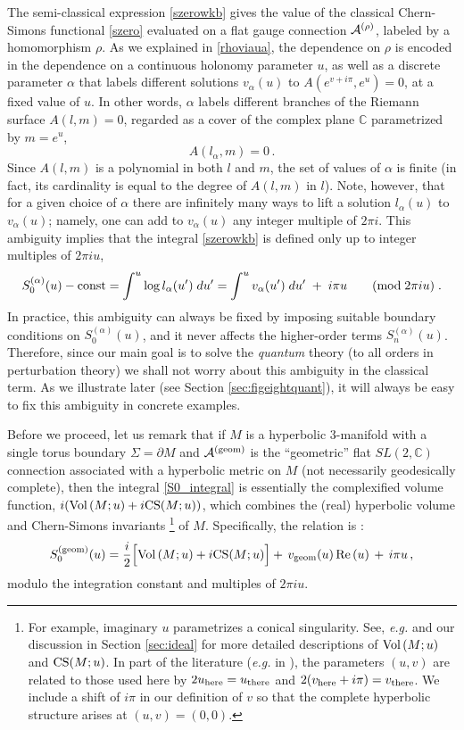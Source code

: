 \documentclass[hyper]{JHEP3}
\renewcommand{\Re}{{\rm Re}\,}
\def\CA {{\cal A}}
\newcommand{\C}{{\mathbb{C}}}
\newcommand\be{\begin{equation}}
\newcommand\ee{\end{equation}}
\newcommand{\Vol}{{\mbox{Vol\,}}}
\begin{document}
The semi-classical expression \eqref{szerowkb} gives the value of the classical
Chern-Simons functional \eqref{szero} evaluated on a flat gauge connection $\CA^{(\rho)}$,
labeled by a homomorphism $\rho$.
As we explained in \eqref{rhoviaua}, the dependence on $\rho$ is encoded in
the dependence on a continuous holonomy parameter $u$, as well as a discrete parameter $\alpha$
that labels different solutions $v_{\alpha} (u)$ to $A (e^{v + i\pi} , e^u) = 0$,
at a fixed value of $u$.
In other words, $\alpha$ labels different branches of the Riemann surface $A(l,m) = 0$,
regarded as a cover of the complex plane $\C$ parametrized by $m = e^u$,
\be
A (l_{\alpha} , m) = 0\,.
\label{abranches}
\ee
Since $A(l,m)$ is a polynomial in both $l$ and $m$, the set of values of $\alpha$
is finite (in fact, its cardinality is equal to the degree of $A(l,m)$ in $l$).
Note, however, that for a given choice of $\alpha$ there are infinitely many ways to
lift a solution $l_{\alpha} (u)$ to $v_{\alpha} (u)$; namely, one can add to $v_{\alpha} (u)$
any integer multiple of $2\pi i$.
This ambiguity implies that the integral \eqref{szerowkb} is defined only
up to integer multiples of $2 \pi i u$,
\be
S_0^{(\alpha)}(u) - {\rm const}
=  \int^u\log l_\alpha(u')\;du' = \int^u v_\alpha(u')\;du'
\;+\; i \pi u \qquad (\mbox{mod}\;2\pi i u)\;.
\label{S0_integral}
\ee
In practice, this ambiguity can always be fixed by imposing
suitable boundary conditions on $S_0^{(\alpha)}(u)$, and it never affects
the higher-order terms $S_n^{(\alpha)}(u)$.
Therefore, since our main goal is to solve the {\it quantum} theory
(to all orders in perturbation theory) we shall not worry about this
ambiguity in the classical term.
As we illustrate later (see Section \ref{sec:figeightquant}),
it will always be easy to fix this ambiguity in concrete examples.

Before we proceed, let us remark that if $M$ is a hyperbolic 3-manifold
with a single torus boundary $\Sigma = \partial M$ and $\CA^{({\rm geom})}$
is the ``geometric'' flat $SL(2,\C)$ connection associated with a hyperbolic
metric on $M$ (not necessarily geodesically complete),
then the integral \eqref{S0_integral} is essentially
the complexified volume function,
$i(\Vol (M;u) +i {\rm CS} (M;u))$,
which combines the (real) hyperbolic volume and Chern-Simons
invariants%
\footnote{For example, imaginary $u$ parametrizes a conical singularity.
See, {\it e.g.} \cite{thurston-1980, nz-1985, yoshida-1985} and our discussion in Section \ref{sec:ideal}
for more detailed descriptions of $\Vol(M;u)$ and ${\rm CS} (M;u)$. In part of the literature ({\it e.g.} in \cite{nz-1985}), the parameters $(u,v)$ are related to those used here by $2u_{\rm here}=u_{\rm there}$ and $2(v_{\rm here}+i\pi)=v_{\rm there}$. We include a shift of $i\pi$ in our definition of $v$ so that the complete hyperbolic structure arises at $(u,v)=(0,0)$.} %
%
of $M$. Specifically, the relation is \cite{gukov-2003,nz-1985}:
\be
S_0^{({\rm geom})} (u)
= \frac{i}{2}\Big[ \Vol (M;u) +  i {\rm CS} (M;u) \Big]
+ \,v_{{\rm geom}}(u)\,\Re(u) \,+\, i \pi u\,,
\label{S0_volume}
\ee
modulo the integration constant and multiples of $2\pi i u$.
\end{document}
